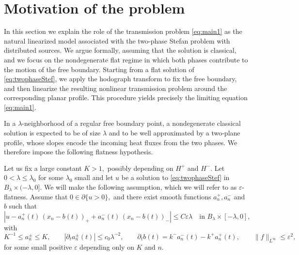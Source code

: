\documentclass[12pt]{article}
\numberwithin{Theorem}{section}
\theoremstyle{definition}
\theoremstyle{remark}
\numberwithin{equation}{section}
\newcommand{\p}{\partial}
\begin{document}
\section{Motivation of the problem} \label{sec:motivation}

In this section we explain the role of the transmission problem
\eqref{eq:main1} 
as the natural linearized model associated with the
two-phase Stefan problem with distributed sources. We argue formally, assuming that the solution is classical, and we focus on the nondegenerate
flat regime in which both phases contribute to the motion of the free
boundary. Starting from a flat solution of \eqref{eq:twophaseStef}, we
apply the hodograph transform to fix the free boundary, and then
linearize the resulting nonlinear transmission problem around the
corresponding planar profile. This procedure yields precisely the limiting equation \eqref{eq:main1}.




In a $\lambda$-neighborhood of a regular free boundary point, a
nondegenerate classical solution is expected to be of size $\lambda$ and
to be well approximated by a two-plane profile, whose slopes encode the
incoming heat fluxes from the two phases. We therefore impose the
following flatness hypothesis.

Let us fix a large constant $K>1,$ possibly depending on $H^{+}$ and $H^{-}$. Let $0<\lambda \leq \lambda_0$ for some $\lambda_0$ small and let $u$ be a solution to \eqref{eq:twophaseStef} in $B_{\lambda} \times(-\lambda,0]$. We will make the following assumption, which we will refer to as $\varepsilon$-flatness.
Assume that $0\in \p \{u>0\},$ and there exist smooth functions $a_n^+, a_n^-$ and $b$  such that  
\begin{equation} \label{eps-flat}
\left|u - a_n^+(t) \, \left (x_n - b(t)\right)_+ + a_n^-(t) \, \left (x_n - b(t)\right)_- \right| \leq C\varepsilon \lambda \quad \text{in } B_\lambda \times [-\lambda, 0],
\end{equation}
 with 
 \begin{equation} \label{eq:nondeghp}
 K^{-1}\le a_n^\pm \le K, \quad \quad |{\p_t} a_n^{\pm}(t)| \le  c_0\lambda^{-2}, \quad \quad {\p_t} b(t)= k^{-}a_n^-(t)-k^{+}a_n^+(t),\quad\quad  \|f\|_{L^\infty}\leq \varepsilon^2,
 \end{equation}
for some small positive $\varepsilon$ depending only on $K $ and $n$.
\end{document}
